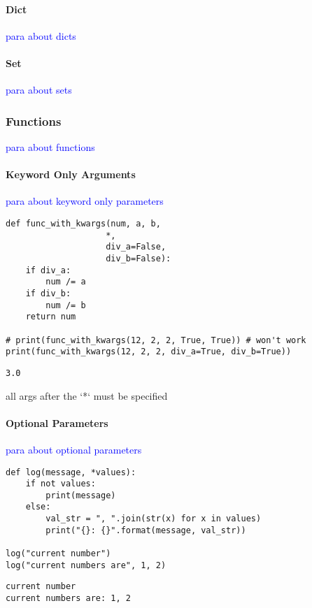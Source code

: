 \paragraph{Dict}

\textcolor{blue}{para about dicts}

\paragraph{Set}

\textcolor{blue}{para about sets}

\subsubsection{Functions}

\textcolor{blue}{para about functions}

\paragraph{Keyword Only Arguments}

\textcolor{blue}{para about keyword only parameters}

\begin{lstlisting}[style=pyInStyle]
def func_with_kwargs(num, a, b,
                    *,
                    div_a=False,
                    div_b=False):
    if div_a:
        num /= a
    if div_b:
        num /= b
    return num

# print(func_with_kwargs(12, 2, 2, True, True)) # won't work
print(func_with_kwargs(12, 2, 2, div_a=True, div_b=True))
\end{lstlisting}
\begin{lstlisting}[style=pyOutStyle]
3.0
\end{lstlisting}
\begin{markdown}
all args after the `*` must be specified
\end{markdown}


\paragraph{Optional Parameters}

\textcolor{blue}{para about optional parameters}

\begin{lstlisting}[style=pyInStyle]
def log(message, *values):
    if not values:
        print(message)
    else:
        val_str = ", ".join(str(x) for x in values)
        print("{}: {}".format(message, val_str))

log("current number")
log("current numbers are", 1, 2)
\end{lstlisting}
\begin{lstlisting}[style=pyOutStyle]
current number
current numbers are: 1, 2
\end{lstlisting}

